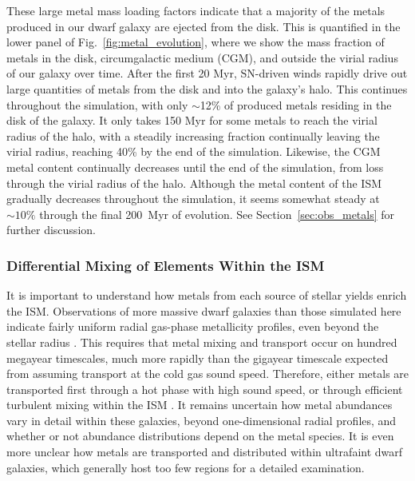 \documentclass[twocolumn]{aastex61}
\begin{document}
These large metal mass loading factors indicate that a majority of the metals produced in our dwarf galaxy are ejected from the disk. This is quantified in the lower panel of Fig.~\ref{fig:metal_evolution}, where we show the mass fraction of metals in the disk, circumgalactic medium (CGM), and outside the virial radius of our galaxy over time. After the first 20 Myr, SN-driven winds rapidly drive out large quantities of metals from the disk and into the galaxy's halo. This continues throughout the simulation, with only $\sim$12\% of produced metals residing in the disk of the galaxy. It only takes 150 Myr for some metals to reach the virial radius of the halo, with a steadily increasing fraction continually leaving the virial radius, reaching 40\% by the end of the simulation. Likewise, the CGM metal content continually decreases until the end of the simulation, from loss through the virial radius of the halo. Although the metal content of the ISM gradually decreases throughout the simulation, it seems somewhat steady at $\sim 10\%$ through the final 200~Myr of evolution. See Section~\ref{sec:obs_metals} for further discussion.

\subsubsection{Differential Mixing of Elements Within the ISM}
It is important to understand how metals from each source of stellar yields enrich the ISM. Observations of more massive dwarf galaxies than those simulated here indicate fairly uniform radial gas-phase metallicity profiles, even beyond the stellar radius \citep[e.g.][]{Werk2011,Belfiore2017}. This requires that metal mixing and transport occur on hundred megayear timescales, much more rapidly than the gigayear timescale expected from assuming transport at the cold gas sound speed. Therefore, either metals are transported first through a hot phase with high sound speed, or through efficient turbulent mixing within the ISM \citep[e.g.][]{Avillez2002,Tassis2008,YangKrumholz2012}. It remains uncertain how metal abundances vary in detail within these galaxies, beyond one-dimensional radial profiles, and whether or not abundance distributions depend on the metal species. It is even more unclear how metals are transported and distributed within ultrafaint dwarf galaxies, which generally host too few  regions for a detailed examination.

\end{document}
